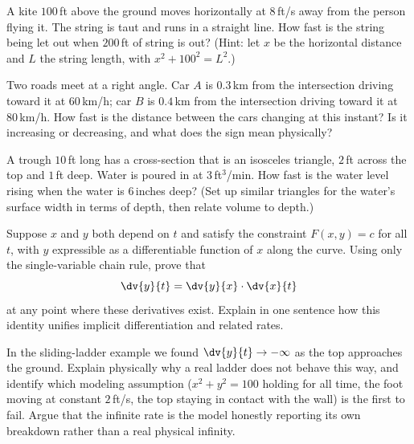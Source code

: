 \begin{exercise}
A kite $100$\,ft above the ground moves horizontally at $8$\,ft/s away from the person flying it. The
string is taut and runs in a straight line. How fast is the string being let out when $200$\,ft of
string is out? (Hint: let $x$ be the horizontal distance and $L$ the string length, with $x^2 +
100^2 = L^2$.)
\end{exercise}

\begin{exercise}
Two roads meet at a right angle. Car $A$ is $0.3$\,km from the intersection driving toward it at
$60$\,km/h; car $B$ is $0.4$\,km from the intersection driving toward it at $80$\,km/h. How fast is
the distance between the cars changing at this instant? Is it increasing or decreasing, and what does
the sign mean physically?
\end{exercise}

\begin{exercise}
A trough $10$\,ft long has a cross-section that is an isosceles triangle, $2$\,ft across the top and
$1$\,ft deep. Water is poured in at $3$\,ft$^3$/min. How fast is the water level rising when the water
is $6$\,inches deep? (Set up similar triangles for the water's surface width in terms of depth, then
relate volume to depth.)
\end{exercise}

\begin{exercise}[Proof]
Suppose $x$ and $y$ both depend on $t$ and satisfy the constraint $F(x,y)=c$ for all $t$, with $y$
expressible as a differentiable function of $x$ along the curve. Using only the single-variable chain
rule, prove that
\[
\dv{y}{t} = \dv{y}{x}\cdot\dv{x}{t}
\]
at any point where these derivatives exist. Explain in one sentence how this identity unifies
implicit differentiation and related rates.
\end{exercise}

\begin{exercise}[Conceptual]
In the sliding-ladder example we found $\dv{y}{t}\to -\infty$ as the top approaches the ground.
Explain physically why a real ladder does not behave this way, and identify which modeling assumption
($x^2 + y^2 = 100$ holding for all time, the foot moving at constant $2$\,ft/s, the top staying in
contact with the wall) is the first to fail. Argue that the infinite rate is the model honestly
reporting its own breakdown rather than a real physical infinity.
\end{exercise}
